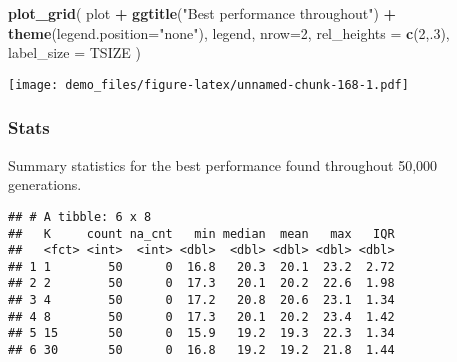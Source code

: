 \documentclass[]{book}
\newenvironment{Shaded}{\begin{snugshade}}{\end{snugshade}}
\newcommand{\DataTypeTok}[1]{\textcolor[rgb]{0.13,0.29,0.53}{#1}}
\newcommand{\DecValTok}[1]{\textcolor[rgb]{0.00,0.00,0.81}{#1}}
\newcommand{\KeywordTok}[1]{\textcolor[rgb]{0.13,0.29,0.53}{\textbf{#1}}}
\newcommand{\NormalTok}[1]{#1}
\newcommand{\OperatorTok}[1]{\textcolor[rgb]{0.81,0.36,0.00}{\textbf{#1}}}
\newcommand{\OtherTok}[1]{\textcolor[rgb]{0.56,0.35,0.01}{#1}}
\newcommand{\StringTok}[1]{\textcolor[rgb]{0.31,0.60,0.02}{#1}}
\begin{document}
\begin{Shaded}
\begin{Highlighting}[]
\KeywordTok{plot_grid}\NormalTok{(}
\NormalTok{  plot }\OperatorTok{+}
\StringTok{    }\KeywordTok{ggtitle}\NormalTok{(}\StringTok{"Best performance throughout"}\NormalTok{) }\OperatorTok{+}
\StringTok{    }\KeywordTok{theme}\NormalTok{(}\DataTypeTok{legend.position=}\StringTok{"none"}\NormalTok{),}
\NormalTok{  legend,}
  \DataTypeTok{nrow=}\DecValTok{2}\NormalTok{,}
  \DataTypeTok{rel_heights =} \KeywordTok{c}\NormalTok{(}\DecValTok{2}\NormalTok{,.}\DecValTok{3}\NormalTok{),}
  \DataTypeTok{label_size =}\NormalTok{ TSIZE}
\NormalTok{)}
\end{Highlighting}
\end{Shaded}

\texttt{[image: demo\_files/figure-latex/unnamed-chunk-168-1.pdf]}

\hypertarget{stats-77}{%
\subsubsection{Stats}\label{stats-77}}

Summary statistics for the best performance found throughout 50,000 generations.

\begin{Shaded}
\end{Shaded}

\begin{verbatim}
## # A tibble: 6 x 8
##   K     count na_cnt   min median  mean   max   IQR
##   <fct> <int>  <int> <dbl>  <dbl> <dbl> <dbl> <dbl>
## 1 1        50      0  16.8   20.3  20.1  23.2  2.72
## 2 2        50      0  17.3   20.1  20.2  22.6  1.98
## 3 4        50      0  17.2   20.8  20.6  23.1  1.34
## 4 8        50      0  17.3   20.1  20.2  23.4  1.42
## 5 15       50      0  15.9   19.2  19.3  22.3  1.34
## 6 30       50      0  16.8   19.2  19.2  21.8  1.44
\end{verbatim}
\end{document}
